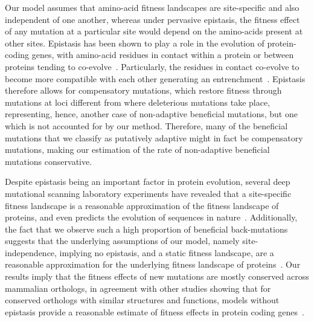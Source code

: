 \documentclass{article}
\begin{document}
    Our model assumes that amino-acid fitness landscapes are site-specific and also independent of one another, whereas under pervasive epistasis, the fitness effect of any mutation at a particular site would depend on the amino-acids present at other sites.
    Epistasis has been shown to play a role in the evolution of protein-coding genes, with amino-acid residues in contact within a protein or between proteins tending to co-evolve~\cite{morcos_directcoupling_2011, marks_protein_2012, starr_epistasis_2016}.
    Particularly, the residues in contact co-evolve to become more compatible with each other generating an entrenchment~\cite{goldstein_nonadaptive_2015, goldstein_sequence_2017, park_epistatic_2022}.
    Epistasis therefore allows for compensatory mutations, which restore fitness through mutations at loci different from where deleterious mutations take place, representing, hence, another case of non-adaptive beneficial mutations, but one which is not accounted for by our method.
    Therefore, many of the beneficial mutations that we classify as putatively adaptive might in fact be compensatory mutations, making our estimation of the rate of non-adaptive beneficial mutations conservative.

    Despite epistasis being an important factor in protein evolution, several deep mutational scanning laboratory experiments have revealed that a site-specific fitness landscape is a reasonable approximation of the fitness landscape of proteins, and even predicts the evolution of sequences in nature~\cite{ashenberg_mutational_2013, doud_sitespecific_2015, bloom_identification_2017}.
    Additionally, the fact that we observe such a high proportion of beneficial back-mutations suggests that the underlying assumptions of our model, namely site-independence, implying no epistasis, and a static fitness landscape, are a reasonable approximation for the underlying fitness landscape of proteins~\cite{youssef_consequences_2020}.
    Our results imply that the fitness effects of new mutations are mostly conserved across mammalian orthologs, in agreement with other studies showing that for conserved orthologs with similar structures and functions, models without epistasis provide a reasonable estimate of fitness effects in protein coding genes~\cite{ashenberg_mutational_2013, doud_sitespecific_2015, bloom_identification_2017, youssef_consequences_2020}.
\end{document}

